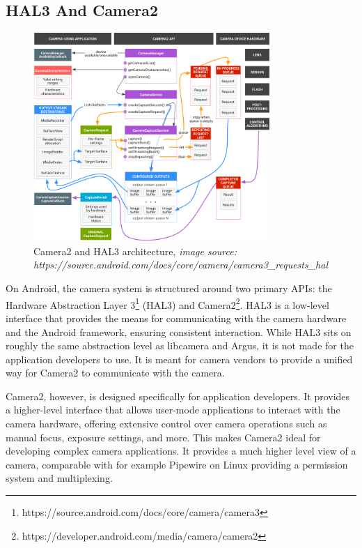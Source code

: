 \subsection{HAL3 And Camera2}
\begin{figure}
    \begin{center}
        \includegraphics[width=0.80\textwidth]{figures/camera2.png}
    \end{center}
    \caption{Camera2 and HAL3 architecture,
    \textit{image source: https://source.android.com/docs/core/camera/camera3\_requests\_hal}}\label{fig:camera2}
\end{figure}


On Android, the camera system is structured around two primary APIs: the
Hardware Abstraction Layer 3\footnote{https://source.android.com/docs/core/camera/camera3} (HAL3)
and Camera2\footnote{https://developer.android.com/media/camera/camera2}. HAL3
is a low-level interface that provides the means for communicating with the
camera hardware and the Android framework, ensuring consistent interaction.
While HAL3 sits on roughly the same abstraction level as libcamera and Argus,
it is not made for the application developers to use. It is meant for camera
vendors to provide a unified way for Camera2 to communicate with the camera.

Camera2, however, is designed specifically for application developers. It
provides a higher-level interface that allows user-mode applications to
interact with the camera hardware, offering extensive control over camera
operations such as manual focus, exposure settings, and more. This makes
Camera2 ideal for developing complex camera applications. It provides a much
higher level view of a camera, comparable with for example Pipewire on Linux
providing a permission system and multiplexing.

